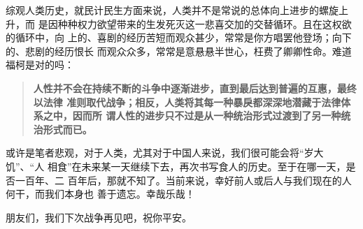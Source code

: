 综观人类历史，就民计民生方面来说，人类并不是常说的总体向上进步的螺旋上升，而
是因种种权力欲望带来的生发死灭这一悲喜交加的交替循环。且在这权欲的循环中，向
上的、喜剧的经历苦短而观众甚少，常常是你方唱罢他登场；向下的、悲剧的经历恨长
而观众众多，常常是意悬悬半世心，枉费了卿卿性命。难道福柯是对的吗：
\begin{quotation}
  \textbf{人性并不会在持续不断的斗争中逐渐进步，直到最后达到普遍的互惠，最终以法律
    准则取代战争；相反，人类将其每一种暴戾都深深地潜藏于法律体系之中，因而所
    谓人性的进步只不过是从一种统治形式过渡到了另一种统治形式而已。}
\end{quotation}


或许是笔者悲观，对于人类，尤其对于中国人来说，我们很可能会将“岁大饥”、“人
相食”在未来某一天继续下去，再次书写食人的历史。至于在哪一天，是否一百年、二
百年后，那就不知了。当前来说，幸好前人或后人与我们现在的人何干，而我们本身也
善于遗忘。幸哉乐哉！

朋友们，我们下次战争再见吧，祝你平安。
